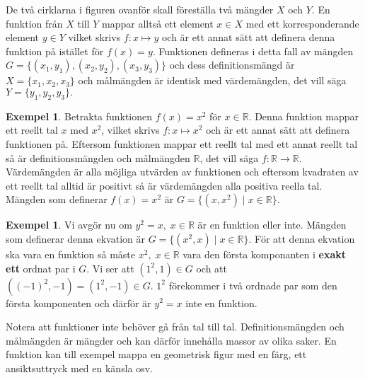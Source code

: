 \documentclass{article}
\theoremstyle{definition}
\newtheorem{exmp}[thm]{Exempel}
\begin{document}
De två cirklarna i figuren ovanför skall föreställa två mängder $X$ och $Y$. En funktion 
från $X$ till $Y$ mappar alltså ett element $x \in X$ med ett korresponderande element $y \in Y$
vilket skrivs $f: x \mapsto y$ och är ett annat sätt att definera denna funktion på istället för $f(x) = y$.
Funktionen defineras i detta fall av mängden $G = \{ (x_1, y_1), (x_2, y_2), (x_3, y_3) \}$ och dess 
definitionsmängd är $X = \{ x_1, x_2, x_3\}$ och målmängden är identisk med värdemängden, det vill säga $Y = \{ y_1, y_2, y_3\}.$ 

\begin{exmp}
  Betrakta funktionen $f(x) = x^2$ för $x \in \mathbb{R}$. Denna funktion mappar 
  ett reellt tal $x$ med $x^2$, vilket skrivs 
  $f: x \mapsto x^2$
  och är ett annat sätt att definera funktionen på.
  Eftersom funktionen mappar ett reellt tal med ett annat reellt tal så är definitionsmängden
  och målmängden $\mathbb{R}$, det vill säga 
  $f: \mathbb{R} \rightarrow \mathbb{R}.$
  Värdemängden är alla möjliga utvärden av funktionen och eftersom kvadraten av ett reellt tal alltid 
  är positivt så är värdemängden alla positiva reella tal. 
  Mängden som definerar $f(x) = x^2$ är
  $G = \{ (x, x^2) \; | \; x \in \mathbb{R}\}.$  
\end{exmp}

\begin{exmp}
  Vi avgör nu om $y^2 = x, \; x \in \mathbb{R}$ är en funktion eller inte. 
  Mängden 
  som definerar denna ekvation är $G = \{ (x^2, x) \; | \; x \in \mathbb{R} \}.$
  För att denna ekvation ska vara en funktion
  så måste $x^2, \; x \in \mathbb{R}$ vara den första komponanten i \textbf{exakt ett} ordnat par i $G$.
  Vi ser att $(1^2, 1) \in G$ och att $((-1)^2, -1) = (1^2, -1) \in G$. 
  $1^2$ förekommer i två ordnade par som den första komponenten och därför är 
  $y^2 = x$ inte en funktion.  
\end{exmp}

Notera att funktioner inte behöver gå från tal till tal. Definitionsmängden och målmängden är 
mängder och kan därför innehålla massor av olika saker. En funktion kan till exempel 
mappa en geometrisk figur med en färg, ett ansiktsuttryck med en känsla osv. 
\end{document}

